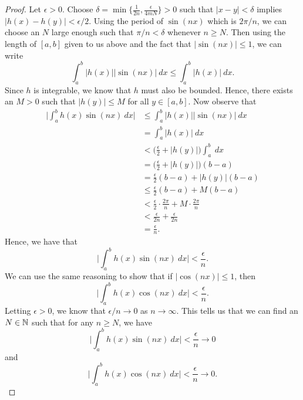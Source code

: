 \begin{proof}
    Let \( \epsilon > 0  \). Choose \( \delta = \min \{ \frac{ 1 }{ 2n } , \frac{ \epsilon  }{ 4mN  }   \} > 0   \) such that \(  | x - y  |  < \delta  \) implies \( | h(x) - h(y)  | < \epsilon / 2  \). Using the period of \( \sin(nx)  \) which is \( 2 \pi / n  \), we can choose an \( N  \) large enough such that \( \pi / n  < \delta  \) whenever \( n \geq N  \). Then using the length of \([a,b]   \) given to us above and the fact that \( | \sin(nx) | \leq 1  \), we can write  
    \[  \int_{ a }^{ b } | h(x)  |  | \sin(nx) |  \ dx \leq \int_{ a }^{ b } | h(x) |  \ dx. \]
    Since \( h  \) is integrable, we know that \( h  \) must also be bounded. Hence, there exists an \( M > 0  \) such that \( | h(y) | \leq M  \) for all \( y \in [a,b] \). Now observe that  
    \begin{align*}
        \Big| \int_{ a }^{ b } h(x) \sin(nx) \ dx  \Big| &\leq \int_{ a }^{ b } | h(x)  |  | \sin(nx) |  \ dx \\
                                                         &= \int_{ a }^{ b } | h(x) |  \ dx \\
                                                         &< \Big( \frac{ \epsilon  }{ 2 } + | h(y) |  \Big) \int_{ a }^{ b }  \ dx \\
                                                         &= \Big( \frac{ \epsilon  }{ 2 } + | h(y) |  \Big)(b-a) \\
                                                         &= \frac{ \epsilon  }{ 2 }  (b-a) + | h(y) | (b-a) \\
                                                         &\leq \frac{ \epsilon  }{ 2 } (b-a) + M (b-a) \\
                                                         &< \frac{ \epsilon  }{ 2  } \cdot \frac{ 2 \pi  }{ n }  + M \cdot \frac{ 2 \pi  }{ n } \\
                                                         &< \frac{ \epsilon  }{ 2n }  + \frac{ \epsilon  }{ 2  n  } \\
                                                         &= \frac{ \epsilon  }{ n }.
    \end{align*}
    Hence, we have that 
    \[  \Big| \int_{ a }^{ b } h(x) \sin(nx) \ dx \Big| < \frac{ \epsilon  }{ n }. \] We can use the same reasoning to show that if \( | \cos(nx) | \leq 1  \), then 
    \[  \Big| \int_{ a }^{ b } h(x) \cos(nx) \ dx \Big|  < \frac{ \epsilon  }{ n }. \]
    Letting \( \epsilon > 0  \), we know that \( \epsilon / n  \to 0  \) as \( n \to \infty  \). This tells us that we can find an \( N \in \mathbb{N}  \) such that for any \( n \geq N  \), we have 
    \[  \Big| \int_{ a }^{ b } h(x) \sin(nx) \ dx \Big| < \frac{ \epsilon  }{ n }  \to 0  \]
    and 
    \[  \Big| \int_{ a }^{ b } h(x) \cos(nx)  \ dx \Big| < \frac{ \epsilon  }{ n } \to 0. \]
\end{proof}

